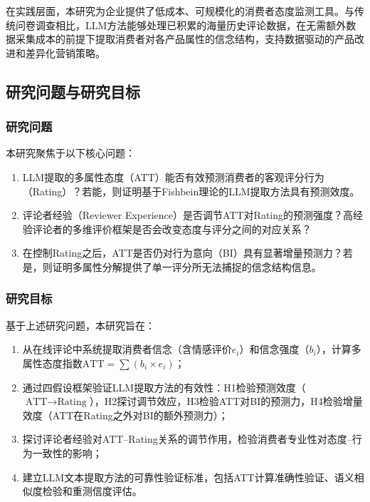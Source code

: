 在实践层面，本研究为企业提供了低成本、可规模化的消费者态度监测工具。与传统问卷调查相比，LLM方法能够处理已积累的海量历史评论数据，在无需额外数据采集成本的前提下提取消费者对各产品属性的信念结构，支持数据驱动的产品改进和差异化营销策略。

\subsection{研究问题与研究目标}

\subsubsection{研究问题}

本研究聚焦于以下核心问题：

\begin{enumerate}
  \item LLM提取的多属性态度（ATT）能否有效预测消费者的客观评分行为（Rating）？若能，则证明基于Fishbein理论的LLM提取方法具有预测效度。
  \item 评论者经验（Reviewer Experience）是否调节ATT对Rating的预测强度？高经验评论者的多维评价框架是否会改变态度与评分之间的对应关系？
  \item 在控制Rating之后，ATT是否仍对行为意向（BI）具有显著增量预测力？若是，则证明多属性分解提供了单一评分所无法捕捉的信念结构信息。
\end{enumerate}

\subsubsection{研究目标}

基于上述研究问题，本研究旨在：

\begin{enumerate}
  \item 从在线评论中系统提取消费者信念（含情感评价$e_i$）和信念强度（$b_i$），计算多属性态度指数$\text{ATT} = \sum(b_i \times e_i)$；
  \item 通过四假设框架验证LLM提取方法的有效性：H1检验预测效度（$\text{ATT} \to \text{Rating}$），H2探讨调节效应，H3检验ATT对BI的预测力，H4检验增量效度（ATT在Rating之外对BI的额外预测力）；
  \item 探讨评论者经验对ATT--Rating关系的调节作用，检验消费者专业性对态度--行为一致性的影响；
  \item 建立LLM文本提取方法的可靠性验证标准，包括ATT计算准确性验证、语义相似度检验和重测信度评估。
\end{enumerate}

